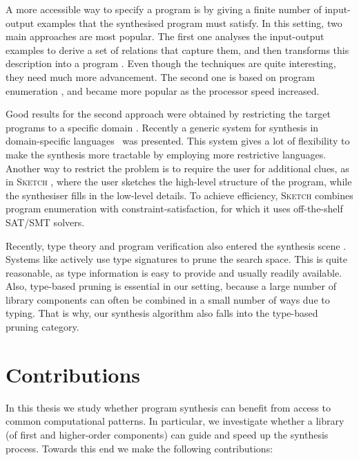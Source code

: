 A more accessible way to specify a program is by giving a finite number of input-output examples that the synthesised program must satisfy.  In this setting, two main approaches are most popular.  The first one analyses the input-output examples to derive a set of relations that capture them, and then transforms this description into a program \cite{Summers:1977:MLP:321992.322002,Kitzelmann:2009:AIF:1530575.1530582,Jha:2010:OCP:1806799.1806833}.  Even though the techniques are quite interesting, they need much more advancement.  The second one is based on program enumeration \cite{LambdaSquarePaper,EscherPaper,MythPaper}, and became more popular as the processor speed increased.

Good results for the second approach were obtained by restricting the target programs to a specific domain \cite{Gulwani:2011:ASP:1926385.1926423,Gulwani:2011:SGC:1993498.1993505}. Recently a generic system for synthesis in domain-specific languages~\cite{Perelman:2014:TS:2594291.2594297} was presented.  This system gives a lot of flexibility to make the synthesis more tractable by employing more restrictive languages.  Another way to restrict the problem is to require the user for additional clues, as in \textsc{Sketch} \cite{Solar-Lezama:2006:CSF:1168857.1168907}, where the user sketches the high-level structure of the program, while the synthesiser fills in the low-level details.  To achieve efficiency, \textsc{Sketch} combines program enumeration with constraint-satisfaction, for which it uses off-the-shelf SAT/SMT solvers.

Recently, type theory and program verification also entered the synthesis scene \cite{LeonPaper,DBLP:journals/corr/InalaQLS15,Kuncak:2010:CFS:1806596.1806632,Frankle:2016:EST:2837614.2837629}.  Systems like \cite{LambdaSquarePaper,MythPaper,SynquidPaper} actively use type signatures to prune the search space.  This is quite reasonable, as type information is easy to provide and usually readily available.  Also, type-based pruning is essential in our setting, because a large number of library components can often be combined in a small number of ways due to typing.  That is why, our synthesis algorithm also falls into the type-based pruning category.

\section{Contributions}
In this thesis we study whether program synthesis can benefit from access to common computational patterns.  In particular, we investigate whether a library (of first and higher-order components) can guide and speed up the synthesis process.  Towards this end we make the following contributions:

